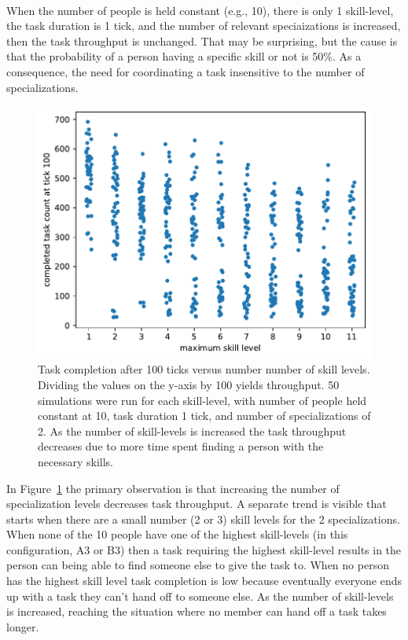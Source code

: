 \ \\

When the number of people is held constant (e.g., 10), there is only 1 skill-level, the task duration is 1 tick, and the number of relevant speciaizations is increased, then the task throughput is unchanged. That may be surprising, but the cause is that the probability of a person having a specific skill or not is 50\%. As a consequence, the need for coordinating a task insensitive to the number of specializations.



\begin{figure}[!htb] %
\centering
\includegraphics[width=1\textwidth]{images/task_distribution_completed_versus_size_simCount50_skills2_levels1to12_taskduration1_people10_social0_ticks100.pdf}
\caption{Task completion after 100 ticks versus number number of skill levels. Dividing the values on the y-axis by 100 yields throughput. 50 simulations were run for each skill-level, with number of people held constant at 10, task duration 1 tick, and number of specializations of 2. 
As the number of skill-levels is increased the task throughput decreases due to more time spent finding a person with the necessary skills. 
}
\label{fig:task-distribution-completed-vs-size}
\end{figure}

In Figure~\ref{fig:task-distribution-completed-vs-size} the primary observation is that increasing the number of specialization levels decreases task throughput. 
A separate trend is visible that starts when there are a small number (2 or 3) skill levels for the 2 specializations. When none of the 10 people have one of the highest skill-levels (in this configuration, A3 or B3) then a task requiring the highest skill-level results in the person can being able to find someone else to give the task to. When no person has the highest skill level task completion is low because eventually everyone ends up with a task they can't hand off to someone else. As the number of skill-levels is increased, reaching the situation where no member can hand off a task takes longer. 


